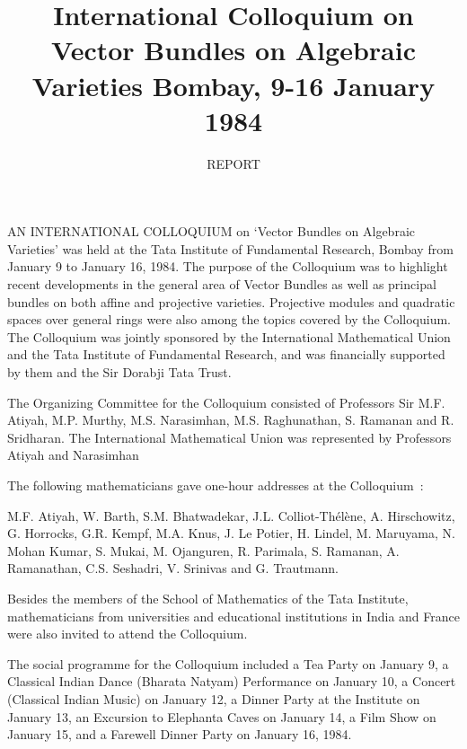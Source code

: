 \title{International Colloquium on Vector Bundles on Algebraic
  Varieties\break
{\fontsize{13}{15}\selectfont Bombay, 9-16 January 1984}}

\author{REPORT}
\date{}
\maketitle

\thispagestyle{empty}

AN INTERNATIONAL  COLLOQUIUM on `Vector Bundles on Algebraic Varieties'
was held at the Tata Institute of Fundamental Research, Bombay from
January 9 to January 16, 1984. The purpose of the Colloquium was to
highlight recent developments in the general area of Vector Bundles as
well as principal bundles on both affine and projective
varieties. Projective modules and quadratic spaces over general rings
were also among the topics covered by the Colloquium. The Colloquium
was jointly sponsored by the International Mathematical Union and the
Tata Institute of Fundamental Research, and was financially supported
by them and the Sir Dorabji Tata Trust.

The Organizing Committee for the Colloquium consisted of Professors
Sir M.F. Atiyah, M.P. Murthy, M.S. Narasimhan, M.S. Raghunathan,
S. Ramanan and R. Sridharan. The International Mathematical Union was
represented by Professors Atiyah and Narasimhan

The following mathematicians gave one-hour addresses at the
Colloquium~:

\smallskip
\noindent
M.F. Atiyah, W. Barth, S.M. Bhatwadekar, J.L. Colliot-Th\'el\`ene,
A. Hirschowitz, G. Horrocks, G.R. Kempf, M.A. Knus, J. Le Potier,
H. Lindel, M. Maruyama, N. Mohan Kumar, S. Mukai, M. Ojanguren,
R. Parimala, S. Ramanan, A. Ramanathan, C.S. Seshadri, V. Srinivas and
G. Trautmann.

\newpage

\noindent
Besides the members of the School of Mathematics of the Tata
Institute, mathematicians from universities and educational
institutions in India and France were also invited to attend the
Colloquium.

\smallskip
\noindent
The social programme for the Colloquium included a Tea Party on
January 9, a Classical Indian Dance (Bharata Natyam) Performance on
January 10, a Concert (Classical Indian Music) on January 12, a Dinner
Party at the Institute on January 13, an Excursion to Elephanta Caves
on January 14, a Film Show on January 15, and a Farewell Dinner Party
on January 16, 1984. 

\lhead[]{}

